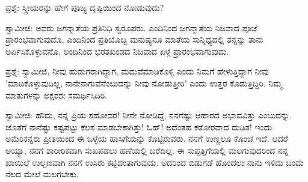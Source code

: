 ಪ್ರಶ್ನೆ: ಸ್ತ್ರೀಯರನ್ನು ಹೇಗೆ ಪೂಜ್ಯ ದೃಷ್ಟಿಯಿಂದ ನೋಡುವುದು?

ಸ್ವಾಮೀಜಿ: ಅವರು ಜಗನ್ಮಾತೆಯ ಪ್ರತಿನಿಧಿ ಸ್ವರೂಪರು. ಎಂದಿನಿಂದ ಜಗನ್ಮಾತೆಯ ನಿಜವಾದ ಪೂಜೆ ಪ್ರಾರಂಭವಾಗುವುದೊ, ಎಂದಿನಿಂದ ಪ್ರತಿಯೊಬ್ಬ ಮನುಷ್ಯನೂ ಮಾತೆಯ ಸಾನ್ನಿಧ್ಯದಲ್ಲಿ ತನ್ನನ್ನು ತಾನು ಅರ್ಪಿಸಿಕೊಳ್ಳುವನೊ, ಅಂದಿನಿಂದ ಭರತಖಂಡದ ನಿಜವಾದ ಏಳ್ಗೆ ಪ್ರಾರಂಭವಾಗುವುದು.

ಪ್ರಶ್ನೆ: ಸ್ವಾಮೀಜಿ, ನೀವು ಹುಡುಗರಾಗಿದ್ದಾಗ, ಮದುವೆಮಾಡಿಕೊಳ್ಳಿ ಎಂದು ನಿಮಗೆ ಹೇಳುತ್ತಿದ್ದಾಗ ನೀವು 'ಮಾಡಿಕೊಳ್ಳುವುದಿಲ್ಲ, ನಾನೇನಾಗುವೆನೆಂಬುದನ್ನು ನೀವು ನೋಡುತ್ತೀರಿ' ಎಂದು ಉತ್ತರ ಕೊಡುತ್ತಿದ್ದಿರಿ. ನಿಮ್ಮ ಮಾತುಗಳನ್ನು ಅಕ್ಷರಶಃ ಸಮರ್ಥಿಸಿದಿರಿ.

ಸ್ವಾಮೀಜಿ: ಹೌದು, ನನ್ನ ಪ್ರಿಯ ಸಹೋದರ! ನೀನೇ ನೋಡಿದ್ದೆ, ನನಗೆಷ್ಟು ಆಹಾರದ ಅಭಾವವಿತ್ತು ಎಂಬುದನ್ನು. ಜೊತೆಗೆ ನಾನೆಷ್ಟು ಕಷ್ಟಪಟ್ಟು ಕೆಲಸ ಮಾಡಬೇಕಾಗಿತ್ತು! ಓಹ್! ಅದೆಂತಹ ಕಠೋರವಾದ ದುಡಿತ! ಇಂದು ಅಮೆರಿಕನ್ನರು ಪ್ರೀತಿಯಿಂದ ಈ ಒಳ್ಳೆಯ ಹಾಸಿಗೆಯನ್ನು ಕೊಟ್ಟಿರುವರು. ನನಗೆ ಉಣ್ಣಲೂ ಕೊಂಚ ಇದೆ. ಆದರೆ ಅಯ್ಯಾ, ನನಗೆ ಶಾರೀರಿಕವಾಗಿ ಸುಖಪಡಲು ಹಣೆಯಲ್ಲಿ ಬರೆದಿಲ್ಲ. ಈ ಸುಪ್ಪತ್ತಿಗೆಯಲ್ಲಿ ಮಲಗುವುದರಿಂದ ನನ್ನ ಖಾಯಿಲೆ ಉಲ್ಬಣವಾಗಿ ನನಗೆ ಉಸಿರು ಕಟ್ಟಿದಂತಾಗುವುದು. ಅದರಿಂದ ಬಿಡುಗಡೆ ಹೊಂದಲು ನಾನು ಇಳಿದು ಬಂದು ನೆಲದ ಮೇಲೆ ಮಲಗಬೇಕು.

